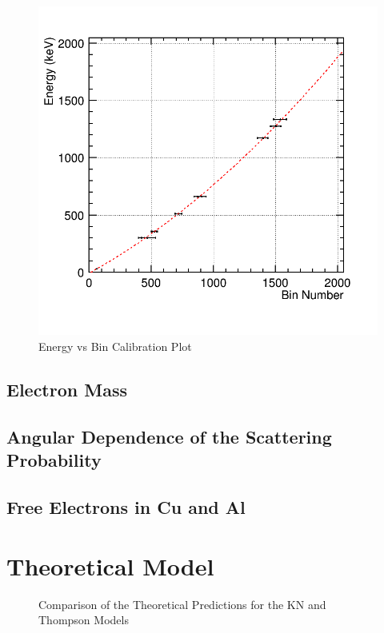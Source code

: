\documentclass[%
 reprint,
 amsmath,amssymb,
 aps,
 pra,
]{revtex4-1}
\begin{document}
\begin{figure}[H]
\centering	
	\includegraphics[scale=0.3]{../plots/BinvEnergy.png}
	\caption{Energy vs Bin Calibration Plot}
	\label{Fig:EvBin}
\end{figure}

\subsection{Electron Mass}

\subsection{Angular Dependence of the Scattering Probability}

\subsection{Free Electrons in Cu and Al}

\section{Theoretical Model}

\begin{figure}[H]
	\centering
	\caption{Comparison of the Theoretical Predictions for the KN and Thompson Models}
	\label{KN_vs_Thompson_Theory}
\end{figure}
\end{document}
